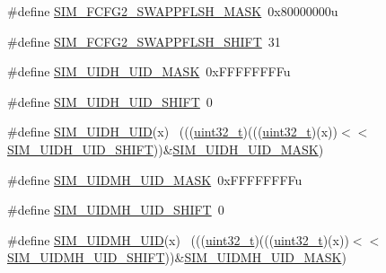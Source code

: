 \begin{DoxyCompactItemize}
\item 
\#define \hyperlink{group___s_i_m___register___masks_ga9e43eb1fe8cf3bc2b415b94b85409da3}{S\+I\+M\+\_\+\+F\+C\+F\+G2\+\_\+\+S\+W\+A\+P\+P\+F\+L\+S\+H\+\_\+\+M\+A\+SK}~0x80000000u
\item 
\#define \hyperlink{group___s_i_m___register___masks_gab18fc86e3344548dbc17e941e7d7ef54}{S\+I\+M\+\_\+\+F\+C\+F\+G2\+\_\+\+S\+W\+A\+P\+P\+F\+L\+S\+H\+\_\+\+S\+H\+I\+FT}~31
\item 
\#define \hyperlink{group___s_i_m___register___masks_ga313fa2a8e328043458a9ec1e3125c75f}{S\+I\+M\+\_\+\+U\+I\+D\+H\+\_\+\+U\+I\+D\+\_\+\+M\+A\+SK}~0x\+F\+F\+F\+F\+F\+F\+F\+Fu
\item 
\#define \hyperlink{group___s_i_m___register___masks_ga2984b4c4d6bb4339997aee03c8a263b1}{S\+I\+M\+\_\+\+U\+I\+D\+H\+\_\+\+U\+I\+D\+\_\+\+S\+H\+I\+FT}~0
\item 
\#define \hyperlink{group___s_i_m___register___masks_ga1f030a932e2f9157c66511f34099f61a}{S\+I\+M\+\_\+\+U\+I\+D\+H\+\_\+\+U\+ID}(x)                                                ~(((\hyperlink{_p_e___types_8h_a33594304e786b158f3fb30289278f5af}{uint32\+\_\+t})(((\hyperlink{_p_e___types_8h_a33594304e786b158f3fb30289278f5af}{uint32\+\_\+t})(x))$<$$<$\hyperlink{group___s_i_m___register___masks_ga2984b4c4d6bb4339997aee03c8a263b1}{S\+I\+M\+\_\+\+U\+I\+D\+H\+\_\+\+U\+I\+D\+\_\+\+S\+H\+I\+FT}))\&\hyperlink{group___s_i_m___register___masks_ga313fa2a8e328043458a9ec1e3125c75f}{S\+I\+M\+\_\+\+U\+I\+D\+H\+\_\+\+U\+I\+D\+\_\+\+M\+A\+SK})
\item 
\#define \hyperlink{group___s_i_m___register___masks_ga38dffcb27b09a015e2f2e7812d42477c}{S\+I\+M\+\_\+\+U\+I\+D\+M\+H\+\_\+\+U\+I\+D\+\_\+\+M\+A\+SK}~0x\+F\+F\+F\+F\+F\+F\+F\+Fu
\item 
\#define \hyperlink{group___s_i_m___register___masks_ga56b83da182908eb5c406181b72870e54}{S\+I\+M\+\_\+\+U\+I\+D\+M\+H\+\_\+\+U\+I\+D\+\_\+\+S\+H\+I\+FT}~0
\item 
\#define \hyperlink{group___s_i_m___register___masks_gab8c2021ee119a8badd1b3767547274f7}{S\+I\+M\+\_\+\+U\+I\+D\+M\+H\+\_\+\+U\+ID}(x)                                              ~(((\hyperlink{_p_e___types_8h_a33594304e786b158f3fb30289278f5af}{uint32\+\_\+t})(((\hyperlink{_p_e___types_8h_a33594304e786b158f3fb30289278f5af}{uint32\+\_\+t})(x))$<$$<$\hyperlink{group___s_i_m___register___masks_ga56b83da182908eb5c406181b72870e54}{S\+I\+M\+\_\+\+U\+I\+D\+M\+H\+\_\+\+U\+I\+D\+\_\+\+S\+H\+I\+FT}))\&\hyperlink{group___s_i_m___register___masks_ga38dffcb27b09a015e2f2e7812d42477c}{S\+I\+M\+\_\+\+U\+I\+D\+M\+H\+\_\+\+U\+I\+D\+\_\+\+M\+A\+SK})

\end{DoxyCompactItemize}

